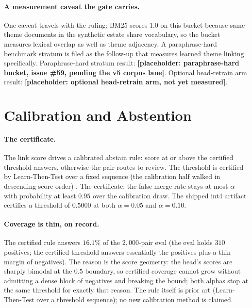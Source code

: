 \documentclass{article}
\newcommand{\todo}[1]{\textbf{[placeholder: #1]}}
\begin{document}
\paragraph{A measurement caveat the gate carries.}
One caveat travels with the ruling: BM25 scores $1.0$ on this bucket because same-theme documents in the synthetic estate share vocabulary, so the bucket measures lexical overlap as well as theme adjacency. A paraphrase-hard benchmark stratum is filed as the follow-up that measures learned theme linking specifically.
Paraphrase-hard stratum result: \todo{paraphrase-hard bucket, issue \#59, pending the v5 corpus lane}.
Optional head-retrain arm result: \todo{optional head-retrain arm, not yet measured}.
\section{Calibration and Abstention}
\label{sec:calibration}

\paragraph{The certificate.}
The link score drives a calibrated abstain rule: score at or above the certified threshold answers, otherwise the pair routes to review. The threshold is certified by Learn-Then-Test over a fixed sequence (the calibration half walked in descending-score order) \citep{angelopoulos2021ltt}. The certificate: the false-merge rate stays at most $\alpha$ with probability at least $0.95$ over the calibration draw. The shipped int4 artifact certifies a threshold of $0.5000$ at both $\alpha=0.05$ and $\alpha=0.10$.

\paragraph{Coverage is thin, on record.}
The certified rule answers $16.1\%$ of the $2{,}000$-pair eval (the eval holds $310$ positives; the certified threshold answers essentially the positives plus a thin margin of negatives). The reason is the score geometry: the head's scores are sharply bimodal at the $0.5$ boundary, so certified coverage cannot grow without admitting a dense block of negatives and breaking the bound; both alphas stop at the same threshold for exactly that reason. The rule itself is prior art (Learn-Then-Test over a threshold sequence); no new calibration method is claimed.
\end{document}
